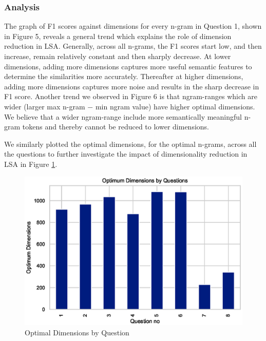 \documentclass[10pt,letterpaper]{article}
\begin{document}
\subsubsection{Analysis}
The graph of F1 scores against dimensions for every n-gram in Question 1, shown in Figure 5, reveals a general trend which explains the role of dimension reduction in LSA. Generally, across all n-grams, the F1 scores start low, and then increase, remain relatively constant and then sharply decrease. At lower dimensions, adding more dimensions captures more useful semantic features to determine the similarities more accurately. Thereafter at higher dimensions, adding more dimensions captures more noise and results in the sharp decrease in F1 score. Another trend we observed in Figure 6 is that ngram-ranges which are wider (larger max n-gram $-$ min ngram value) have higher optimal dimensions. We believe that a wider ngram-range include more semantically meaningful n-gram tokens and thereby cannot be reduced to lower dimensions.

We similarly plotted the optimal dimensions, for the optimal n-grams, across all the questions to further investigate the impact of dimensionality reduction in LSA in Figure \ref{OptimumDimensions}.

\begin{figure}[ht]
\begin{center}
\includegraphics[width=\linewidth]{img/OptimumDimensions.eps}
\end{center}
\caption{Optimal Dimensions by Question}
\label{OptimumDimensions}
\end{figure}
\end{document}

